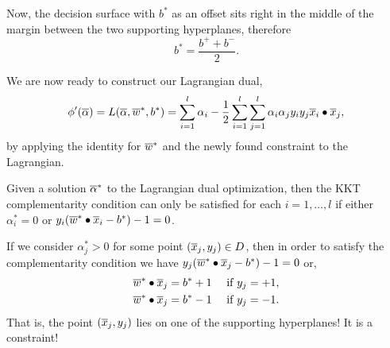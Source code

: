 \documentclass[a4paper,blends,pdf,colorBG,slideColor]{prosper}
\begin{document}

\vspace{.2in}
Now, the decision surface with $b^*$ as an offset sits right in the middle of the margin between the
two supporting hyperplanes, therefore
\begin{equation*}
\label{eq:b-value}
b^* = \frac{b^+ + b^-}{2}.
\end{equation*}
\es

\vspace{.2in}
We are now ready to construct our Lagrangian dual,
\begin{equation*}
 \phi'(\overline{\alpha}) =  L(\overline{\alpha},\overline{w}^*, b^*) 
 =  \sum_{i=1}^l \alpha_i - 
  \frac{1}{2}\sum_{i=1}^l\sum_{j=1}^l \alpha_i \alpha_j y_i y_j \overline{x}_i \bullet \overline{x}_j,
\end{equation*}
by applying the identity for $\overline{w}^*$ and the newly found constraint to the Lagrangian.
\es


\es

\small
Given a solution $\overline{\alpha}^*$ to the Lagrangian dual optimization,
then the KKT complementarity condition  can only be satisfied for each $i = 1,\ldots,l$ if either $\alpha^*_i = 0$ or
$y_i(\overline{w}^*\bullet\overline{x}_i-b^*)-1 = 0$.  

If we consider $\alpha^*_j > 0$ for some point $(\overline{x}_j,y_j)\in D$, then 
in order to satisfy the complementarity condition we have
$y_j(\overline{w}^*\bullet\overline{x}_j-b^*) - 1 = 0$ or,
\begin{align*}
\overline{w}^*\bullet\overline{x}_j & = b^* + 1 \quad\text{ if $y_j = +1$},\\
\overline{w}^*\bullet\overline{x}_j & = b^* - 1 \quad\text{ if $y_j = -1$}.
\end{align*}
That is, the point $(\overline{x}_j,y_j)$ lies on one of the supporting hyperplanes!  It is a constraint!
\end{document}
